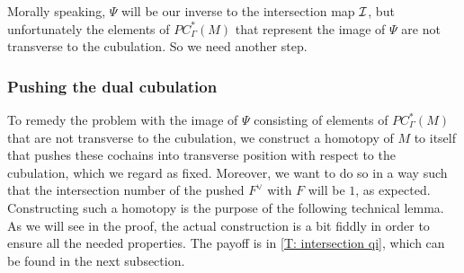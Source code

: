 Morally speaking, $\Psi$ will be our inverse to the intersection map $\mathcal{I}$, but unfortunately the elements of $PC^*_\Gamma(M)$ that represent the image of $\Psi$ are not transverse to the cubulation. So we need another step.

\subsubsection{Pushing the dual cubulation}

To remedy the problem with the image of $\Psi$ consisting of elements of $PC^*_\Gamma(M)$ that are not transverse to the cubulation, we construct a homotopy of $M$ to itself that pushes these cochains into transverse position with respect to the cubulation, which we regard as fixed. Moreover, we want to do so in a way such that the intersection number of the pushed $F^\vee$ with $F$ will be $1$, as expected. Constructing such a homotopy is the purpose of the following technical lemma. As we will see in the proof, the actual construction is a bit fiddly in order to ensure all the needed properties. The payoff is in \cref{T: intersection qi}, which can be found in the next subsection.

